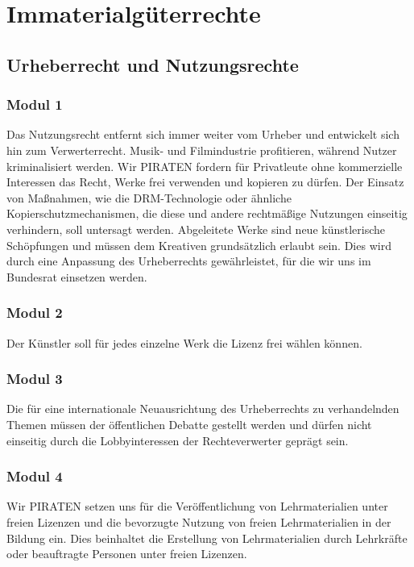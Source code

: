 \section{Immaterialgüterrechte}

\subsection*{Urheberrecht und Nutzungsrechte}
\subsubsection{Modul 1}
\abstimmung
Das Nutzungsrecht entfernt sich immer weiter vom Urheber und entwickelt sich hin zum Verwerterrecht. Musik- und Filmindustrie profitieren, während Nutzer kriminalisiert werden. Wir PIRATEN fordern für Privatleute ohne kommerzielle Interessen das Recht, Werke frei verwenden und kopieren zu dürfen. Der Einsatz von Maßnahmen, wie die DRM-Technologie oder ähnliche Kopierschutzmechanismen, die diese und andere rechtmäßige Nutzungen einseitig verhindern, soll untersagt werden. Abgeleitete Werke sind neue künstlerische Schöpfungen und müssen dem Kreativen grundsätzlich erlaubt sein. Dies wird durch eine Anpassung des Urheberrechts gewährleistet, für die wir uns im Bundesrat einsetzen werden.

\subsubsection{Modul 2}
\abstimmung
Der Künstler soll für jedes einzelne Werk die Lizenz frei wählen können.

\subsubsection{Modul 3}
\abstimmung
Die für eine internationale Neuausrichtung des Urheberrechts zu verhandelnden Themen müssen der öffentlichen Debatte gestellt werden und dürfen nicht einseitig durch die Lobbyinteressen der Rechteverwerter geprägt sein.

\subsubsection{Modul 4}
\abstimmung
Wir PIRATEN setzen uns für die Veröffentlichung von Lehrmaterialien unter freien Lizenzen und die bevorzugte Nutzung von freien Lehrmaterialien in der Bildung ein. Dies beinhaltet die Erstellung von Lehrmaterialien durch Lehrkräfte oder beauftragte Personen unter freien Lizenzen.


